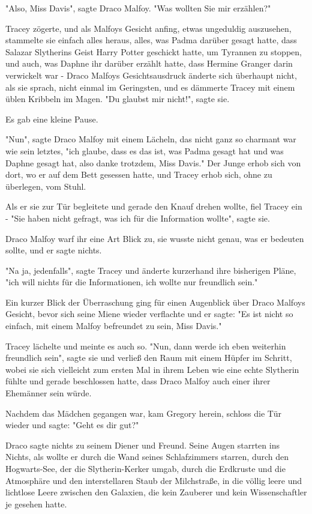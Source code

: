 {"Also, Miss Davis", sagte Draco Malfoy. "Was wollten Sie mir erzählen?"

Tracey zögerte, und als Malfoys Gesicht anfing, etwas ungeduldig auszusehen, stammelte sie einfach alles heraus, alles, was Padma darüber gesagt hatte, dass Salazar Slytherins Geist Harry Potter geschickt hatte, um Tyrannen zu stoppen, und auch, was Daphne ihr darüber erzählt hatte, dass Hermine Granger darin verwickelt war - Draco Malfoys Gesichtsausdruck änderte sich überhaupt nicht, als sie sprach, nicht einmal im Geringsten, und es dämmerte Tracey mit einem üblen Kribbeln im Magen. "Du glaubst mir nicht!", sagte sie.

Es gab eine kleine Pause.

"Nun", sagte Draco Malfoy mit einem Lächeln, das nicht ganz so charmant war wie sein letztes, "ich glaube, dass es das ist, was Padma gesagt hat und was Daphne gesagt hat, also danke trotzdem, Miss Davis." Der Junge erhob sich von dort, wo er auf dem Bett gesessen hatte, und Tracey erhob sich, ohne zu überlegen, vom Stuhl.

Als er sie zur Tür begleitete und gerade den Knauf drehen wollte, fiel Tracey ein - "Sie haben nicht gefragt, was ich für die Information wollte", sagte sie.

Draco Malfoy warf ihr eine Art Blick zu, sie wusste nicht genau, was er bedeuten sollte, und er sagte nichts.

"Na ja, jedenfalls", sagte Tracey und änderte kurzerhand ihre bisherigen Pläne, "ich will nichts für die Informationen, ich wollte nur freundlich sein."

Ein kurzer Blick der Überraschung ging für einen Augenblick über Draco Malfoys Gesicht, bevor sich seine Miene wieder verflachte und er sagte: "Es ist nicht so einfach, mit einem Malfoy befreundet zu sein, Miss Davis."

Tracey lächelte und meinte es auch so. "Nun, dann werde ich eben weiterhin freundlich sein", sagte sie und verließ den Raum mit einem Hüpfer im Schritt, wobei sie sich vielleicht zum ersten Mal in ihrem Leben wie eine echte Slytherin fühlte und gerade beschlossen hatte, dass Draco Malfoy auch einer ihrer Ehemänner sein würde.

Nachdem das Mädchen gegangen war, kam Gregory herein, schloss die Tür wieder und sagte: "Geht es dir gut?"

Draco sagte nichts zu seinem Diener und Freund. Seine Augen starrten ins Nichts, als wollte er durch die Wand seines Schlafzimmers starren, durch den Hogwarts-See, der die Slytherin-Kerker umgab, durch die Erdkruste und die Atmosphäre und den interstellaren Staub der Milchstraße, in die völlig leere und lichtlose Leere zwischen den Galaxien, die kein Zauberer und kein Wissenschaftler je gesehen hatte.

}
